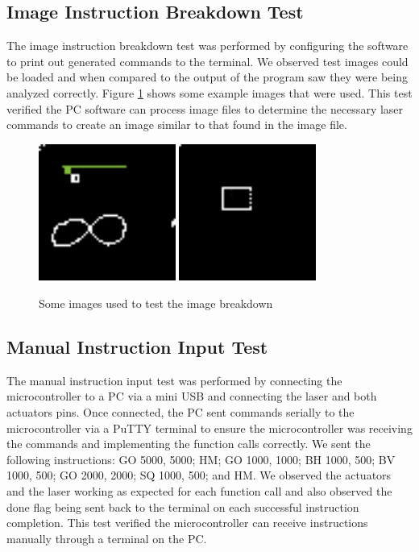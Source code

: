 \documentclass[11pt]{LaTeX-Classes/math-hw}
\begin{document}
\subsection{Image Instruction Breakdown Test}
The image instruction breakdown test was performed by configuring the software to print out
generated commands to the terminal. We observed test images could be loaded and when compared to the output of the program saw they were being
analyzed correctly. Figure \ref{fig:test-images} shows some example images that were used. This test verified the PC software can process image files to determine the necessary laser commands to create an image similar to that found in the image file.
\begin{figure}[H]
  \begin{center}
    \includegraphics[width=0.4\textwidth]{test3}
    \includegraphics[width=0.4\textwidth]{test4}
    \caption{Some images used to test the image breakdown}
    \label{fig:test-images}
  \end{center}
\end{figure}

\subsection{Manual Instruction Input Test}
The manual instruction input test was performed by connecting the microcontroller to a PC via a mini USB and connecting the laser and both actuators pins. Once connected, the PC sent commands serially to the microcontroller via a PuTTY terminal to ensure the microcontroller was receiving the commands and implementing the function calls correctly. We sent the following instructions: GO 5000, 5000; HM; GO 1000, 1000; BH 1000, 500; BV 1000, 500; GO 2000, 2000; SQ 1000, 500; and HM. We observed the actuators and the laser working as expected for each function call and also observed the done flag being sent back to the terminal on each successful instruction completion. This test verified the microcontroller can receive instructions manually through a terminal on the PC.
\end{document}
